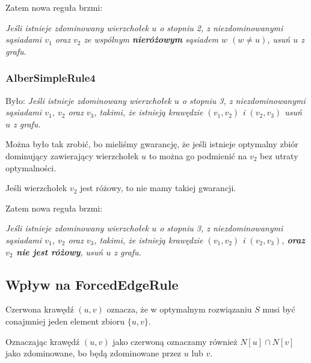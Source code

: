 \documentclass[12pt]{article}
\begin{document}
Zatem nowa reguła brzmi:

\emph{Jeśli istnieje zdominowany wierzchołek $u$ o stopniu 2, z niezdominowanymi sąsiadami $v_1$ oraz $v_2$ ze wspólnym \textbf{nieróżowym} sąsiadem $w$ $(w \neq u)$, usuń $u$ z grafu. }


\subsubsection{AlberSimpleRule4}
Było: \emph{Jeśli istnieje zdominowany wierzchołek $u$ o stopniu 3, z niezdominowanymi sąsiadami $v_1$, $v_2$ oraz $v_3$, takimi, że istnieją krawędzie $(v_1, v_2)$ i $(v_2, v_3)$ usuń $u$ z grafu. }

Można było tak zrobić, bo mieliśmy gwarancję, że jeśli istnieje optymalny zbiór dominujący zawierający wierzchołek $u$ to można go podmienić na $v_2$ bez utraty optymalności. 

Jeśli wierzchołek $v_2$ jest różowy, to nie mamy takiej gwarancji.

Zatem nowa reguła brzmi:

\emph{Jeśli istnieje zdominowany wierzchołek $u$ o stopniu 3, z niezdominowanymi sąsiadami $v_1$, $v_2$ oraz $v_3$, takimi, że istnieją krawędzie $(v_1, v_2)$ i $(v_2, v_3)$, \textbf{oraz $v_2$ nie jest różowy}, usuń $u$ z grafu. }

\subsection{Wpływ na ForcedEdgeRule}
Czerwona krawędź $(u, v)$ oznacza, że w optymalnym rozwiązaniu $S$ musi być conajmniej jeden element zbioru $\{u, v\}$.

Oznaczając krawędź $(u, v)$ jako czerwoną oznaczamy również $N[u] \cap N[v]$ jako zdominowane, bo będą zdominowane przez $u$ lub $v$.
\end{document}
